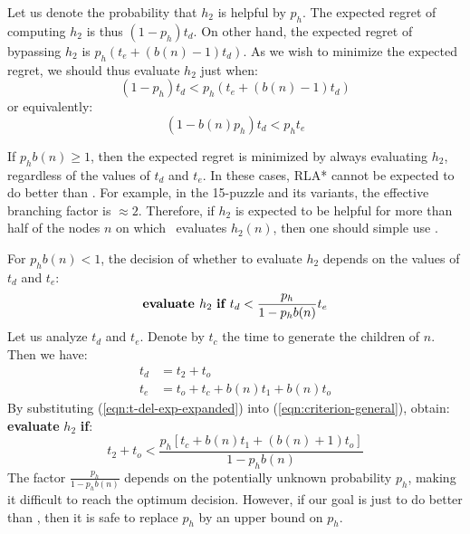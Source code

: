 Let us denote the probability that $h_2$ is helpful by
$p_h$.
The expected regret of computing $h_2$ is thus $(1-p_h) t_d$.
On other hand, the expected regret of bypassing $h_2$ is $p_h(
t_e+(b(n)-1)t_d)$. As we wish to minimize the expected regret, we should thus evaluate $h_2$ just when:
\begin{equation}
(1-p_h) t_d < p_h (t_e+(b(n)-1)t_d)
\end{equation}
or equivalently:
\begin{equation}
(1-b(n) p_h) t_d < p_h t_e
\end{equation}

If $p_h b(n) \ge 1$, then the expected regret is minimized by always
evaluating $h_2$, regardless of the values of $t_d$ and $t_e$.
In these cases, RLA* cannot be expected to do better than \lazyastar.
For example, in the 15-puzzle and its variants, the
effective branching factor is $\approx 2$. Therefore, if $h_2$ is expected to be helpful for more than half of the nodes $n$
on which \lazyastar~evaluates $h_2(n)$, then one should simple use \lazyastar.

For $p_h b(n) < 1$,  the decision of whether to evaluate $h_2$
depends on the values of $t_d$ and $t_e$:
\begin{equation}
\mbox{\bf evaluate }h_2\mbox{ \bf if }t_d<\frac {p_h} {1-p_hb(n)} t_e
\label{eqn:criterion-general}
\end{equation}
Let us analyze $t_d$ and $t_e$. Denote by
$t_c$ the time to generate the children of $n$. Then we have:
\begin{align}
t_d&=t_2+t_o\nonumber\\
t_e&=t_o + t_c+b (n) t_1 + b(n) t_o
\label{eqn:t-del-exp-expanded}
\end{align}
By substituting
(\ref{eqn:t-del-exp-expanded}) into (\ref{eqn:criterion-general}), obtain: {\bf evaluate} $h_2$ {\bf if}:
\begin{equation}
{t_2+t_o}<\frac {p_h \left[{t_c} + b (n)t_1+(b(n)+1){t_o}\right]} {1-p_hb(n)}
\label{eqn:criterion-expanded}
\end{equation}
The factor $\frac {p_h} {1-p_hb(n)}$ depends on the potentially unknown
probability $p_h$, making it difficult to reach the optimum decision.
However, if our goal is just to do better than \lazyastar, then it is safe to replace $p_h$ by an upper bound on $p_h$.

